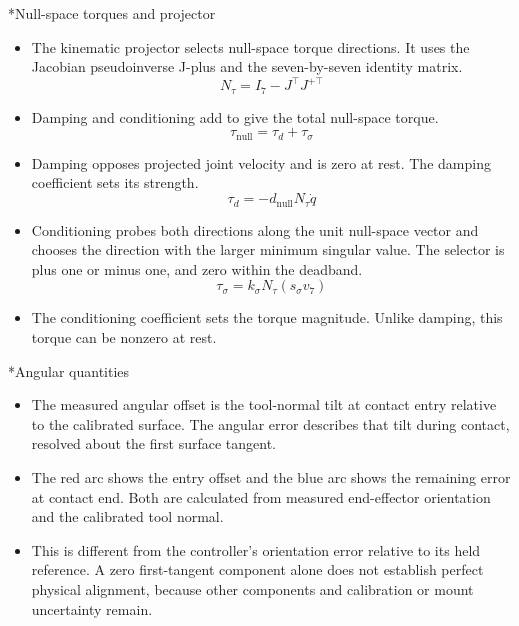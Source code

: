 \documentclass[12pt,a4paper]{article}
\makeatletter
\renewcommand\section{\@startsection{section}{1}{0pt}{14pt}{6pt}{\normalfont\Large\bfseries\color{navy}}}
\makeatother
\begin{document}
\section*{Null-space torques and projector}
\begin{itemize}
\item The kinematic projector selects null-space torque directions. It uses the Jacobian pseudoinverse J-plus and the seven-by-seven identity matrix.
\[
N_\tau=I_7-J^\top J^{+\top}
\]
\item Damping and conditioning add to give the total null-space torque.
\[
\tau_{\mathrm{null}}=\tau_d+\tau_\sigma
\]
\item Damping opposes projected joint velocity and is zero at rest. The damping coefficient sets its strength.
\[
\tau_d=-d_{\mathrm{null}}N_\tau\dot q
\]
\item Conditioning probes both directions along the unit null-space vector and chooses the direction with the larger minimum singular value. The selector is plus one or minus one, and zero within the deadband.
\[
\tau_\sigma=k_\sigma N_\tau(s_\sigma v_7)
\]
\item The conditioning coefficient sets the torque magnitude. Unlike damping, this torque can be nonzero at rest.
\end{itemize}

\section*{Angular quantities}
\begin{itemize}
\item The measured angular offset is the tool-normal tilt at contact entry relative to the calibrated surface. The angular error describes that tilt during contact, resolved about the first surface tangent.
\item The red arc shows the entry offset and the blue arc shows the remaining error at contact end. Both are calculated from measured end-effector orientation and the calibrated tool normal.
\item This is different from the controller's orientation error relative to its held reference. A zero first-tangent component alone does not establish perfect physical alignment, because other components and calibration or mount uncertainty remain.
\end{itemize}
\end{document}
